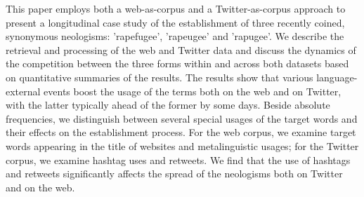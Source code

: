 This paper employs both a web-as-corpus and a Twitter-as-corpus approach to present a longitudinal case study of the establishment of three recently coined, synonymous neologisms: 'rapefugee', 'rapeugee' and 'rapugee'. We describe the retrieval and processing of the web and Twitter data and discuss the dynamics of the competition between the three forms within and across both datasets based on quantitative summaries of the results. The results show that various language-external events boost the usage of the terms both on the web and on Twitter, with the latter typically ahead of the former by some days. Beside absolute frequencies, we distinguish between several special usages of the target words and their effects on the establishment process. For the web corpus, we examine target words appearing in the title of websites and metalinguistic usages; for the Twitter corpus, we examine hashtag uses and retweets. We find that the use of hashtags and retweets significantly affects the spread of the neologisms both on Twitter and on the web.
